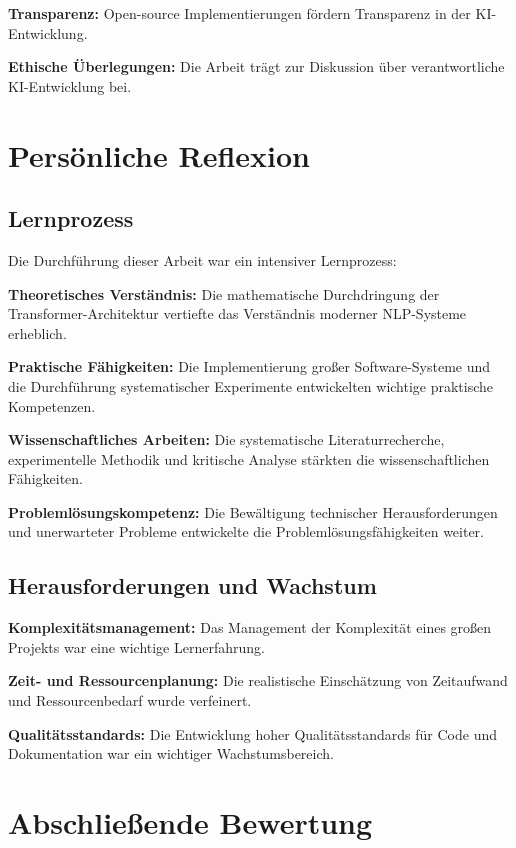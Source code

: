 \textbf{Transparenz:} Open-source Implementierungen fördern Transparenz in der KI-Entwicklung.

\textbf{Ethische Überlegungen:} Die Arbeit trägt zur Diskussion über verantwortliche KI-Entwicklung bei.

\section{Persönliche Reflexion}

\subsection{Lernprozess}

Die Durchführung dieser Arbeit war ein intensiver Lernprozess:

\textbf{Theoretisches Verständnis:} Die mathematische Durchdringung der Transformer-Architektur vertiefte das Verständnis moderner NLP-Systeme erheblich.

\textbf{Praktische Fähigkeiten:} Die Implementierung großer Software-Systeme und die Durchführung systematischer Experimente entwickelten wichtige praktische Kompetenzen.

\textbf{Wissenschaftliches Arbeiten:} Die systematische Literaturrecherche, experimentelle Methodik und kritische Analyse stärkten die wissenschaftlichen Fähigkeiten.

\textbf{Problemlösungskompetenz:} Die Bewältigung technischer Herausforderungen und unerwarteter Probleme entwickelte die Problemlösungsfähigkeiten weiter.

\subsection{Herausforderungen und Wachstum}

\textbf{Komplexitätsmanagement:} Das Management der Komplexität eines großen Projekts war eine wichtige Lernerfahrung.

\textbf{Zeit- und Ressourcenplanung:} Die realistische Einschätzung von Zeitaufwand und Ressourcenbedarf wurde verfeinert.

\textbf{Qualitätsstandards:} Die Entwicklung hoher Qualitätsstandards für Code und Dokumentation war ein wichtiger Wachstumsbereich.

\section{Abschließende Bewertung}

